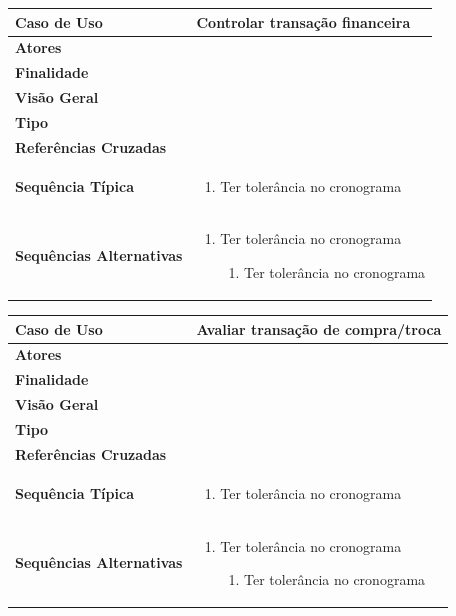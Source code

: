 \documentclass[a4paper,11pt]{article}
\begin{document}
\begin{table}[H]
		\begin{tabularx}{\textwidth}{|l|X|}
		\hline
			\textbf{Caso de Uso} &  Controlar transação financeira \\ \hline
			\textbf{Atores} &    \\ \hline
			\textbf{Finalidade} &   \\ \hline
			\textbf{Visão Geral} &  \\ \hline
			\textbf{Tipo} &  \\ \hline
			\textbf{Referências Cruzadas} &  \\ \hline
			\textbf{Sequência Típica} & 
			\begin{enumerate}
			\item Ter tolerância no cronograma
			\end{enumerate} \\ \hline
			\textbf{Sequências Alternativas} & 
			\begin{enumerate}
			\item Ter tolerância no cronograma
			\begin{enumerate}
			\item Ter tolerância no cronograma
			\end{enumerate}
			\end{enumerate} \\ \hline
		\end{tabularx}
\end{table}

\begin{table}[H]
		\begin{tabularx}{\textwidth}{|l|X|}
		\hline
			\textbf{Caso de Uso} &  Avaliar transação de compra/troca \\ \hline
			\textbf{Atores} &    \\ \hline
			\textbf{Finalidade} &   \\ \hline
			\textbf{Visão Geral} &  \\ \hline
			\textbf{Tipo} &  \\ \hline
			\textbf{Referências Cruzadas} &  \\ \hline
			\textbf{Sequência Típica} & 
			\begin{enumerate}
			\item Ter tolerância no cronograma
			\end{enumerate} \\ \hline
			\textbf{Sequências Alternativas} & 
			\begin{enumerate}
			\item Ter tolerância no cronograma
			\begin{enumerate}
			\item Ter tolerância no cronograma
			\end{enumerate}
			\end{enumerate} \\ \hline
		\end{tabularx}
\end{table}
\end{document}
